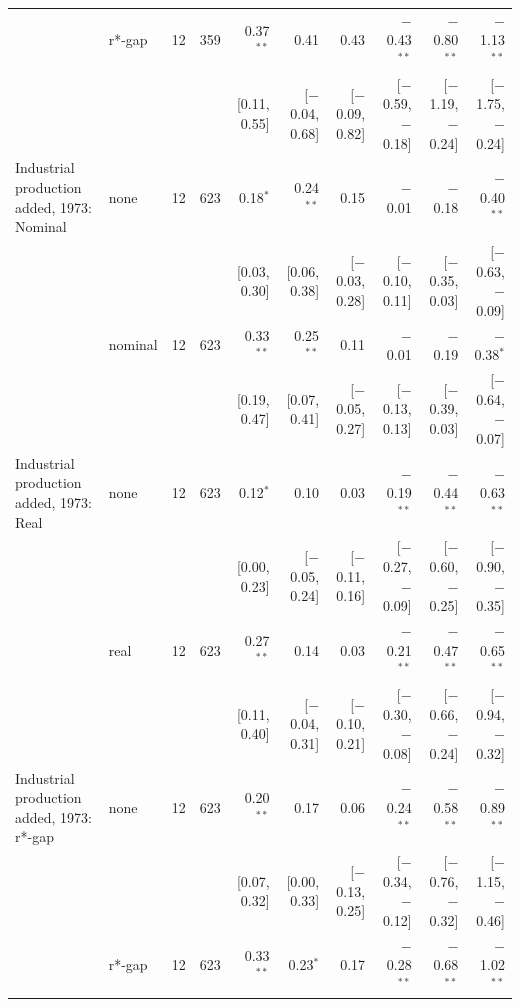 \begin{table}[tp]
{\begin{tabular}{llcrrrrrrr}
 & r*-gap & 12 & 359 & 0.37$^{**}$ & 0.41 & 0.43 & $-$0.43$^{**}$ & $-$0.80$^{**}$ & $-$1.13$^{**}$\\
 & & & & {\scriptsize [0.11, 0.55]} & {\scriptsize [$-$0.04, 0.68]} & {\scriptsize [$-$0.09, 0.82]} & {\scriptsize [$-$0.59, $-$0.18]} & {\scriptsize [$-$1.19, $-$0.24]} & {\scriptsize [$-$1.75, $-$0.24]}\\
\addlinespace
Industrial production added, 1973: Nominal & none & 12 & 623 & 0.18$^{*}$ & 0.24$^{**}$ & 0.15 & $-$0.01 & $-$0.18 & $-$0.40$^{**}$\\
 & & & & {\scriptsize [0.03, 0.30]} & {\scriptsize [0.06, 0.38]} & {\scriptsize [$-$0.03, 0.28]} & {\scriptsize [$-$0.10, 0.11]} & {\scriptsize [$-$0.35, 0.03]} & {\scriptsize [$-$0.63, $-$0.09]}\\
 & nominal & 12 & 623 & 0.33$^{**}$ & 0.25$^{**}$ & 0.11 & $-$0.01 & $-$0.19 & $-$0.38$^{*}$\\
 & & & & {\scriptsize [0.19, 0.47]} & {\scriptsize [0.07, 0.41]} & {\scriptsize [$-$0.05, 0.27]} & {\scriptsize [$-$0.13, 0.13]} & {\scriptsize [$-$0.39, 0.03]} & {\scriptsize [$-$0.64, $-$0.07]}\\
\addlinespace
Industrial production added, 1973: Real & none & 12 & 623 & 0.12$^{*}$ & 0.10 & 0.03 & $-$0.19$^{**}$ & $-$0.44$^{**}$ & $-$0.63$^{**}$\\
 & & & & {\scriptsize [0.00, 0.23]} & {\scriptsize [$-$0.05, 0.24]} & {\scriptsize [$-$0.11, 0.16]} & {\scriptsize [$-$0.27, $-$0.09]} & {\scriptsize [$-$0.60, $-$0.25]} & {\scriptsize [$-$0.90, $-$0.35]}\\
 & real & 12 & 623 & 0.27$^{**}$ & 0.14 & 0.03 & $-$0.21$^{**}$ & $-$0.47$^{**}$ & $-$0.65$^{**}$\\
 & & & & {\scriptsize [0.11, 0.40]} & {\scriptsize [$-$0.04, 0.31]} & {\scriptsize [$-$0.10, 0.21]} & {\scriptsize [$-$0.30, $-$0.08]} & {\scriptsize [$-$0.66, $-$0.24]} & {\scriptsize [$-$0.94, $-$0.32]}\\
\addlinespace
Industrial production added, 1973: r*-gap & none & 12 & 623 & 0.20$^{**}$ & 0.17 & 0.06 & $-$0.24$^{**}$ & $-$0.58$^{**}$ & $-$0.89$^{**}$\\
 & & & & {\scriptsize [0.07, 0.32]} & {\scriptsize [0.00, 0.33]} & {\scriptsize [$-$0.13, 0.25]} & {\scriptsize [$-$0.34, $-$0.12]} & {\scriptsize [$-$0.76, $-$0.32]} & {\scriptsize [$-$1.15, $-$0.46]}\\
 & r*-gap & 12 & 623 & 0.33$^{**}$ & 0.23$^{*}$ & 0.17 & $-$0.28$^{**}$ & $-$0.68$^{**}$ & $-$1.02$^{**}$\\

\end{tabular}}
\end{table}
